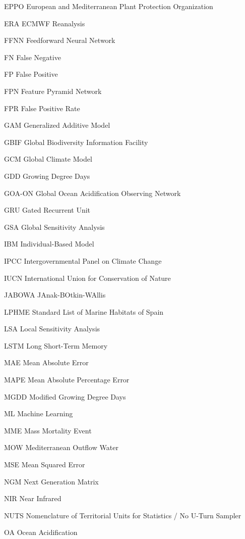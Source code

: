 \begin{abbreviations}
    \item[EPPO] European and Mediterranean Plant Protection Organization
    \item[ERA] ECMWF Reanalysis
    \item[FFNN] Feedforward Neural Network
    \item[FN] False Negative
    \item[FP] False Positive
    \item[FPN] Feature Pyramid Network
    \item[FPR] False Positive Rate
    \item[GAM] Generalized Additive Model
    \item[GBIF] Global Biodiversity Information Facility
    \item[GCM] Global Climate Model
    \item[GDD] Growing Degree Days
    \item[GOA-ON] Global Ocean Acidification Observing Network
    \item[GRU] Gated Recurrent Unit
    \item[GSA] Global Sensitivity Analysis
    \item[IBM] Individual-Based Model
    \item[IPCC] Intergovernmental Panel on Climate Change
    \item[IUCN] International Union for Conservation of Nature
    \item[JABOWA] JAnak-BOtkin-WAllis
    \item[LPHME] Standard List of Marine Habitats of Spain
    \item[LSA] Local Sensitivity Analysis
    \item[LSTM] Long Short-Term Memory
    \item[MAE] Mean Absolute Error
    \item[MAPE] Mean Absolute Percentage Error
    \item[MGDD] Modified Growing Degree Days
    \item[ML] Machine Learning
    \item[MME] Mass Mortality Event
    \item[MOW] Mediterranean Outflow Water
    \item[MSE] Mean Squared Error
    \item[NGM] Next Generation Matrix
    \item[NIR] Near Infrared
    \item[NUTS] Nomenclature of Territorial Units for Statistics / No U-Turn
    Sampler
    \item[OA] Ocean Acidification

\end{abbreviations}
